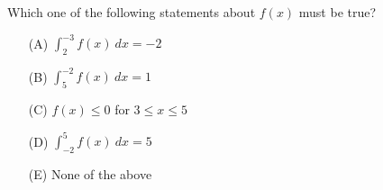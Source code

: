 \documentclass[12pt]{article}
\begin{document}
\begin{enumerate}
Which one of the following statements about $f(x)$ must be true?
\begin{multicols}{2}
\begin{enumerate}
\item[(A)] $\displaystyle \int_{2}^{-3} f(x) \ dx = -2 $
\item[(B)] $\displaystyle \int_{5}^{-2} f(x) \ dx = 1$
\item[(C)] $f(x) \leq 0$ for $3 \leq x \leq 5$
\item[(D)] $\displaystyle \int_{-2}^{5} f(x) \ dx = 5$
\item[(E)] None of the above
\end{enumerate}
\end{multicols}

\vspace{1cm}



\end{enumerate}
\end{document}
